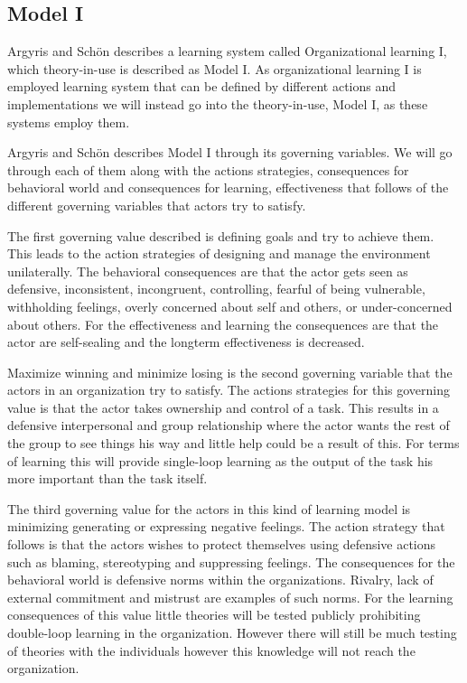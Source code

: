 \subsection{Model I} %
\label{sub:model_i}
Argyris and Schön \cite{Argyris1996} describes a learning system called Organizational learning I, which theory-in-use is described as Model I. As organizational learning I is employed learning system that can be defined by different actions and implementations we will instead go into the theory-in-use, Model I, as these systems employ them.

Argyris and Schön \cite{Argyris1996} describes Model I through its governing variables. We will go through each of them along with the actions strategies, consequences for behavioral world and consequences for learning, effectiveness that follows of the different governing variables that actors try to satisfy. 

The first governing value described is defining goals and try to achieve them. This leads to the action strategies of designing and manage the environment unilaterally. The behavioral consequences are that the actor gets seen as defensive, inconsistent, incongruent, controlling, fearful of being vulnerable, withholding feelings, overly concerned about self and others, or under-concerned about others. For the effectiveness and learning the consequences are that the actor are self-sealing and the longterm effectiveness is decreased. 

Maximize winning and minimize losing is the second governing variable that the actors in an organization try to satisfy. The actions strategies for this governing value is that the actor takes ownership and control of a task. This results in a defensive interpersonal and group relationship where the actor wants the rest of the group to see things his way and little help could be a result of this. For terms of learning this will provide single-loop learning as the output of the task his more important than the task itself. 

The third governing value for the actors in this kind of learning model is minimizing generating or expressing negative feelings. The action strategy that follows is that the actors wishes to protect themselves using defensive actions such as blaming, stereotyping and suppressing feelings. The consequences for the behavioral world is defensive norms within the organizations. Rivalry, lack of external commitment and mistrust are examples of such norms. For the learning consequences of this value little theories will be tested publicly prohibiting double-loop learning in the organization. However there will still be much testing of theories with the individuals however this knowledge will not reach the organization. 

